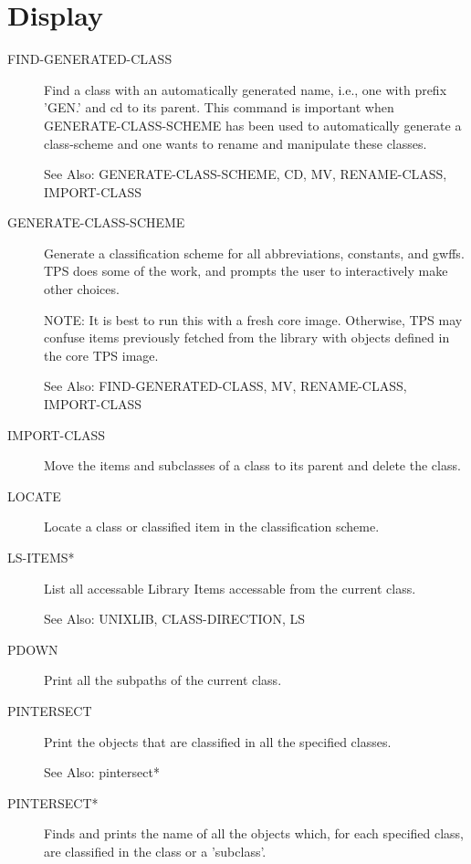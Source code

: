 \section{Display}

\begin{description} 
\item[FIND-GENERATED-CLASS]  
Find a class with an automatically generated name, i.e.,
one with prefix 'GEN.' and cd to its parent.  This command is
important when GENERATE-CLASS-SCHEME has been used to automatically
generate a class-scheme and one wants to rename and manipulate
these classes.

See Also:  GENERATE-CLASS-SCHEME, CD, MV, RENAME-CLASS, IMPORT-CLASS

\item[GENERATE-CLASS-SCHEME]  
Generate a classification scheme for all abbreviations,
constants, and gwffs.  TPS does some of the work, and prompts the
user to interactively make other choices.

NOTE:  It is best to run this with a fresh core image.  Otherwise,
TPS may confuse items previously fetched from the library with
objects defined in the core TPS image.

See Also:  FIND-GENERATED-CLASS, MV, RENAME-CLASS, IMPORT-CLASS

\item[IMPORT-CLASS]  
Move the items and subclasses of a class to its parent
and delete the class.

\item[LOCATE]  
Locate a class or classified item in the classification scheme.

\item[LS-ITEMS*]  
List all accessable Library Items accessable from the current class.

See Also: UNIXLIB, CLASS-DIRECTION, LS

\item[PDOWN]  
Print all the subpaths of the current class.

\item[PINTERSECT]  
Print the objects that are classified in all the specified classes.

See Also: pintersect*

\item[PINTERSECT*]  
Finds and prints the name of all the objects which, for each
specified class, are classified in the class or a 'subclass'.


\end{description}
